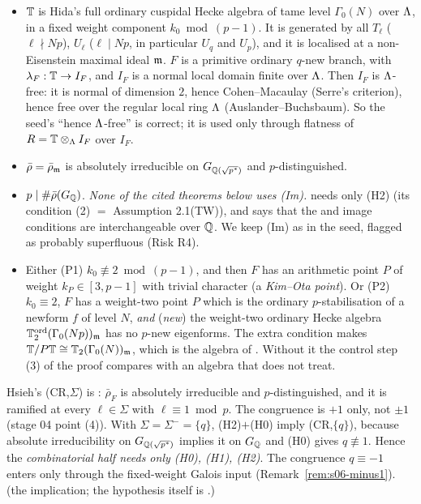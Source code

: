 \begin{hypothesis}
\begin{itemize}
\item[(H1)] $\mathbb{T}$ is Hida's full ordinary cuspidal Hecke algebra of tame level $\Gamma_0(N)$ over $\Lambda$, in a fixed weight component
  $k_0\bmod(p-1)$. It is generated by all $T_\ell$ ($\ell\nmid Np$), $U_\ell$ ($\ell\mid Np$, in particular $U_q$ and $U_p$), and it
  is localised at a non-Eisenstein maximal ideal $\mathfrak{m}$. $F$ is a primitive ordinary $q$-new branch, with $\lambda_F:\mathbb{T}\to I_F$, and
  $I_F$ is a normal local domain finite over $\Lambda$. Then $I_F$ is $\Lambda$-free: it is normal of dimension $2$, hence
  Cohen--Macaulay (Serre's criterion), hence free over the regular local ring $\Lambda$ (Auslander--Buchsbaum). So the seed's
  ``hence $\Lambda$-free'' is correct; it is used only through flatness of $R=\mathbb{T}\otimes_\Lambda I_F$ over $I_F$.
\item[(H2)] $\bar\rho=\bar\rho_{\mathfrak{m}}$ is absolutely irreducible on $G_{\mathbb{Q}(\sqrt{p^*})}$ and $p$-distinguished.
\item[(Im)] $p\mid\#\bar\rho(G_{\mathbb{Q}})$. \emph{None of the cited theorems below uses (Im).} \cite[Thm~1.1]{KO} needs only (H2) (its
  condition (2) $=$ Assumption 2.1(TW)), and \cite[Rem.~2.10]{KO} says that the \cite{DFG} and \cite{Dim09} image conditions are interchangeable
  over $\mathbb{Q}$. We keep (Im) as in the seed, flagged as probably superfluous (Risk R4).
\item[(P)] Either (P1) $k_0\not\equiv2\bmod(p-1)$, and then $F$ has an arithmetic point $P$ of weight $k_P\in[3,p-1]$ with trivial
  character (a \emph{Kim--Ota point}). Or (P2) $k_0\equiv2$, $F$ has a weight-two point $P$ which is the ordinary
  $p$-stabilisation of a newform $f$ of level $N$, \emph{and} (\emph{new}) the weight-two ordinary Hecke algebra
  $\mathbb{T}^{\mathrm{ord}}_2(\Gamma_0(Np))_{\mathfrak{m}}$ has no $p$-new eigenforms. The extra condition makes $\mathbb{T}/P\mathbb{T}\cong\mathbb{T}_2(\Gamma_0(N))_{\mathfrak{m}}$,
  which is the algebra of \cite{KO}. Without it the control step (3) of the proof compares with an algebra that \cite{KO} does not treat.
\end{itemize}
\sthyp
\end{hypothesis}

\begin{remark}\label{rem:s06-CR}
Hsieh's (CR,$\Sigma$) is : $\bar\rho_F$ is absolutely irreducible and $p$-distinguished, and it is ramified at every $\ell\in\Sigma$ with
$\ell\equiv1\bmod p$. The congruence is $+1$ only, not $\pm1$ (stage 04 point (4)). With $\Sigma=\Sigma^-=\{q\}$, (H2)$+$(H0) imply
(CR,$\{q\}$), because absolute irreducibility on $G_{\mathbb{Q}(\sqrt{p^*})}$ implies it on $G_{\mathbb{Q}}$ and (H0) gives $q\not\equiv1$. Hence the
\emph{combinatorial half needs only (H0), (H1), (H2)}. The congruence $q\equiv-1$ enters only through the fixed-weight Galois input
(Remark~\ref{rem:s06-minus1}). \stproved{} (the implication; the hypothesis itself is \stcited.)
\end{remark}

